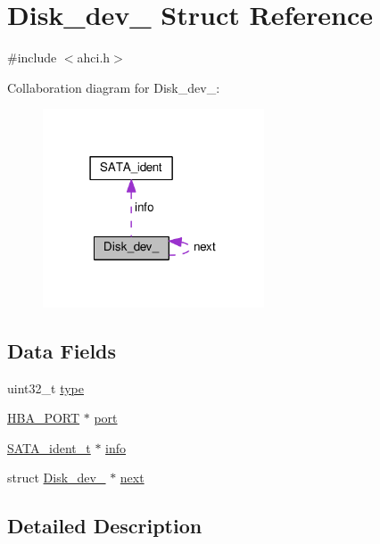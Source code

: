\hypertarget{structDisk__dev__}{}\section{Disk\+\_\+dev\+\_\+ Struct Reference}
\label{structDisk__dev__}


{\ttfamily \#include $<$ahci.\+h$>$}



Collaboration diagram for Disk\+\_\+dev\+\_\+\+:
\nopagebreak
\begin{figure}[H]
\begin{center}
\leavevmode
\includegraphics[width=186pt]{structDisk__dev____coll__graph}
\end{center}
\end{figure}
\subsection*{Data Fields}
\begin{DoxyCompactItemize}
\item 
uint32\+\_\+t \hyperlink{structDisk__dev___a89cfdf098591b267dfc55bd79a8e3335}{type}
\item 
\hyperlink{ahci_8h_ace0b5fb17e1a588ab172cbf436c0a3d3}{H\+B\+A\+\_\+\+P\+O\+RT} $\ast$ \hyperlink{structDisk__dev___acdebd9b96abc7fbf3f115417afc7a887}{port}
\item 
\hyperlink{ahci_8h_a5083eb2c708d3697870e3e6e4cc89e53}{S\+A\+T\+A\+\_\+ident\+\_\+t} $\ast$ \hyperlink{structDisk__dev___a52e2a9b907b950dd16310e9580a43424}{info}
\item 
struct \hyperlink{structDisk__dev__}{Disk\+\_\+dev\+\_\+} $\ast$ \hyperlink{structDisk__dev___aac658457b32e23e97c219973d3a65fb5}{next}
\end{DoxyCompactItemize}


\subsection{Detailed Description}


